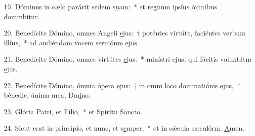 19. Dóminus in cælo parávit sedem s\uline{u}am:~* et regnum ipsíus ómnibus dominb\uline{i}tur.\par 
20. Benedícite Dómino, omnes Angeli \uline{e}jus:~† poténtes virtúte, faciéntes verbum ill\uline{í}us,~* ad audiéndam vocem sermónm \uline{e}jus.\par 
21. Benedícite Dómino, omnes virtútes \uline{e}jus:~* minístri ejus, qui fácitis voluntátm \uline{e}jus.\par 
22. Benedícite Dómino, ómnia ópera \uline{e}jus:~† in omni loco dominatiónis \uline{e}jus,~* bénedic, ánima mea, Dm\uline{i}no.\par 
23. Glória Patri, et F\uline{í}lio,~* et Spirítu S\uline{a}ncto.\par 
24. Sicut erat in princípio, et nunc, et s\uline{e}mper,~* et in sǽcula sæculórm. \uline{A}men.\par 
